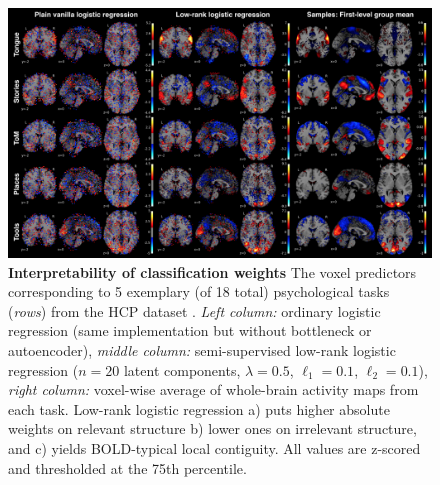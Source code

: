 \documentclass{article} %
\begin{document}
\begin{figure}
\begin{centering}
\includegraphics[width=1.00\textwidth]{figures/figure_weights_perc75.png}
\end{centering}
\caption{\textbf{Interpretability of classification weights}
The voxel predictors corresponding to 5 exemplary
(of 18 total) psychological tasks (\textit{rows})
from the HCP dataset \cite{barch2013}.
\textit{Left column:} ordinary logistic regression (same
implementation but without bottleneck or autoencoder),
\textit{middle column:} semi-supervised low-rank logistic regression
($n=20$ latent components, $\lambda=0.5$, $\ell_1=0.1$, $\ell_2=0.1$),
\textit{right column:} voxel-wise average of whole-brain
activity maps from each task.
Low-rank logistic regression
a) puts higher absolute weights on relevant structure
b) lower ones on irrelevant structure,
and
c) yields BOLD-typical local contiguity.
All values are z-scored and thresholded at the 75th percentile.
}
\end{figure}
\end{document}
